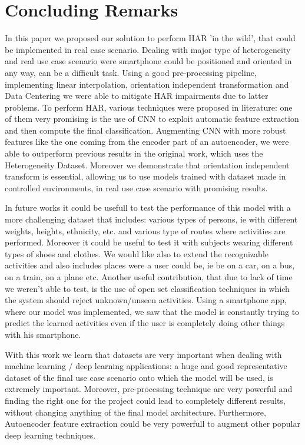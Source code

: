 
\section{Concluding Remarks}
\label{sec:concluding-remarks}

In this paper we proposed our solution to perform HAR 'in the wild', that could be implemented in real case scenario. Dealing with major type of heterogeneity and real use case scenario were smartphone could be positioned and oriented in any way, can be a difficult task. Using a good pre-processing pipeline, implementing linear interpolation, orientation independent transformation and Data Centering we were able to mitigate HAR impairments due to latter problems. To perform HAR, various techniques were proposed in literature: one of them very promising is the use of CNN to exploit automatic feature extraction and then compute the final classification. Augmenting CNN with more robust features like the one coming from the encoder part of an autoencoder, we were able to outperform previous results in the original work, which uses the Heterogeneity Dataset. Moreover we demonstrate that orientation independent transform is essential, allowing us to use models trained with dataset made in controlled environments, in real use case scenario with promising results. 

In future works it could be usefull to test the performance of this model with a more challenging dataset that includes: various types of persons, ie with different weights, heights, ethnicity, etc. and various type of routes where activities are performed. Moreover it could be useful to test it with subjects wearing different types of shoes and clothes. We would like also to extend the recognizable activities and also includes places were a user could be, ie be on a car, on a bus, on a train, on a plane etc. Another useful contribution, that due to lack of time we weren't able to test, is the use of open set classification techniques in which the system should reject unknown/unseen activities. Using a smartphone app, where our model was implemented, we saw that the model is constantly trying to predict the learned activities even if the user is completely doing other things with his smartphone.

With this work we learn that datasets are very important when dealing with machine learning / deep learning applications: a huge and good representative dataset of the final use case scenario onto which the model will be used, is extremely important. Moreover, pre-processing technique are very powerful and finding the right one for the project could lead to completely different results, without changing anything of the final model architecture. Furthermore, Autoencoder feature extraction could be very powerfull to augment other popular deep learning techniques.

